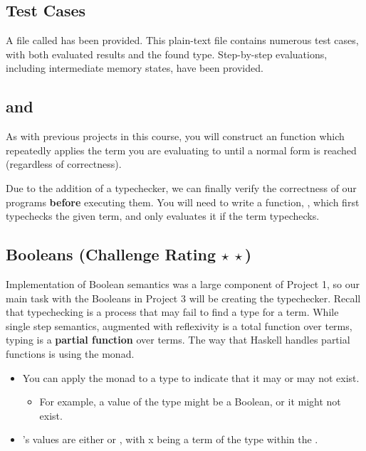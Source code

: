 \documentclass{exam}
\let\OldTexttt\texttt
\renewcommand{\texttt}[1]{\OldTexttt{\color{teal}{#1}}}
\begin{document}
\subsection{Test Cases}
A file called \texttt{Test\_Cases.txt} has been provided.  This plain-text file contains numerous test cases, with both evaluated results and the found type.  Step-by-step evaluations, including intermediate memory states, have been provided.

\subsection{\texttt{eval} and \texttt{run}}
As with previous projects in this course, you will construct an \texttt{eval} function which repeatedly applies the term you are evaluating to \texttt{ssos} until a normal form is reached (regardless of correctness).

Due to the addition of a typechecker, we can finally verify the correctness of our programs \textbf{before} executing them.  You will need to write a function, \texttt{run}, which first typechecks the given term, and only evaluates it if the term typechecks.  

\subsection{Booleans (Challenge Rating $\star\:\star$)}

\texttt{[image: figures/Bool-E.png]}
\texttt{[image: figures/Bool-T.png]}

Implementation of Boolean semantics was a large component of Project 1, so our main task with the Booleans in Project 3 will be creating the typechecker.  Recall that typechecking is a process that may fail to find a type for a term.  While single step semantics, augmented with reflexivity is a total function over terms, typing is a \textbf{partial function} over terms.  The way that Haskell handles partial functions is using the \texttt{Maybe} monad. 
\begin{itemize}
\item You can apply the \texttt{Maybe} monad to a type to indicate that it may or may not exist.
\begin{itemize}
\item For example, a value of the type \texttt{Maybe Bool} might be a Boolean, or it might not exist.  
\end{itemize}
\item \texttt{Maybe}'s values are either \texttt{Just x} or \texttt{Nothing}, with x being a term of the type within the \texttt{Maybe}.
\end{itemize}
\end{document}
